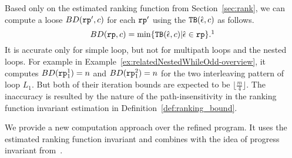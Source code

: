 Based only on the estimated ranking function from Section~\ref{sec:rank}, we can compute a loose $BD(\mathtt{rp}', c)$ for each $\mathtt{rp}'$
using the ${\mathtt{TB}}(\hat{\mathtt{\epsilon}{}}, c)$ as follows.
\begin{equation}
  \label{eq:absBD}
  BD(\rprog, c) = \min\left\{ \absclr(\absevent, c) \middle\vert \absevent \in \rprog \right\}.\footnotemark
\end{equation}
%
It is accurate only for simple loop, but not for multipath loops and the nested loops.
For example in Example~\ref{ex:relatedNestedWhileOdd-overview},
it computes $BD(\mathtt{rp}_1^1) = n$ and $BD(\mathtt{rp}_1^2) = n $ for the two interleaving pattern of loop $L_1$.
But both of their iteration bounds are expected to be $\lfloor\frac{m}{4}\rfloor$.
The inaccuracy is resulted by the nature of the path-insensitivity in the ranking function invariant estimation in Definition~\ref{def:ranking_bound}. 

We provide a new computation approach over the refined program.
It uses the estimated ranking function invariant and combines with the idea of progress invariant from~\cite{GulwaniJK09}.

